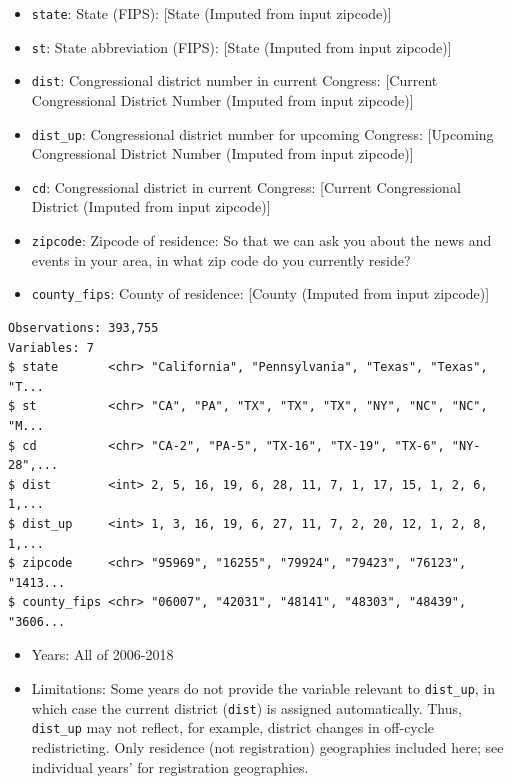 \documentclass[10pt,article,oneside]{memoir}
\theoremstyle{definition}
\begin{document}
\begin{itemize}
\tightlist
\item
  \texttt{state}: State (FIPS): {[}State (Imputed from input zipcode){]}
\item
  \texttt{st}: State abbreviation (FIPS): {[}State (Imputed from input
  zipcode){]}
\item
  \texttt{dist}: Congressional district number in current Congress:
  {[}Current Congressional District Number (Imputed from input
  zipcode){]}
\item
  \texttt{dist\_up}: Congressional district number for upcoming
  Congress: {[}Upcoming Congressional District Number (Imputed from
  input zipcode){]}
\item
  \texttt{cd}: Congressional district in current Congress: {[}Current
  Congressional District (Imputed from input zipcode){]}
\item
  \texttt{zipcode}: Zipcode of residence: So that we can ask you about
  the news and events in your area, in what zip code do you currently
  reside?
\item
  \texttt{county\_fips}: County of residence: {[}County (Imputed from
  input zipcode){]}
\end{itemize}

\begin{verbatim}
Observations: 393,755
Variables: 7
$ state       <chr> "California", "Pennsylvania", "Texas", "Texas", "T...
$ st          <chr> "CA", "PA", "TX", "TX", "TX", "NY", "NC", "NC", "M...
$ cd          <chr> "CA-2", "PA-5", "TX-16", "TX-19", "TX-6", "NY-28",...
$ dist        <int> 2, 5, 16, 19, 6, 28, 11, 7, 1, 17, 15, 1, 2, 6, 1,...
$ dist_up     <int> 1, 3, 16, 19, 6, 27, 11, 7, 2, 20, 12, 1, 2, 8, 1,...
$ zipcode     <chr> "95969", "16255", "79924", "79423", "76123", "1413...
$ county_fips <chr> "06007", "42031", "48141", "48303", "48439", "3606...
\end{verbatim}

\begin{itemize}
\tightlist
\item
  Years: All of 2006-2018
\item
  Limitations: Some years do not provide the variable relevant to
  \texttt{dist\_up}, in which case the current district (\texttt{dist})
  is assigned automatically. Thus, \texttt{dist\_up} may not reflect,
  for example, district changes in off-cycle redistricting. Only
  residence (not registration) geographies included here; see individual
  years' for registration geographies.
\end{itemize}
\end{document}

